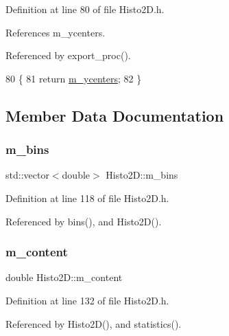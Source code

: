 Definition at line 80 of file Histo2\+D.\+h.



References m\+\_\+ycenters.



Referenced by export\+\_\+proc().


\begin{DoxyCode}
80                            \{  
81     \textcolor{keywordflow}{return} \hyperlink{classHisto2D_a2a431c0f22a038482fc8b3913743f08b}{m\_ycenters};
82   \}
\end{DoxyCode}


\subsection{Member Data Documentation}
\mbox{\label{classHisto2D_a84f6c03673499f34b981cdebf69d22aa}} 
\subsubsection{\texorpdfstring{m\+\_\+bins}{m\_bins}}
{\footnotesize\ttfamily std\+::vector$<$double$>$ Histo2\+D\+::m\+\_\+bins\hspace{0.3cm}{\ttfamily [private]}}



Definition at line 118 of file Histo2\+D.\+h.



Referenced by bins(), and Histo2\+D().

\mbox{\label{classHisto2D_ab70be93148e5c9b24e48b60c6b3b5f89}} 
\subsubsection{\texorpdfstring{m\+\_\+content}{m\_content}}
{\footnotesize\ttfamily double Histo2\+D\+::m\+\_\+content\hspace{0.3cm}{\ttfamily [private]}}



Definition at line 132 of file Histo2\+D.\+h.



Referenced by Histo2\+D(), and statistics().

\mbox{\label{classHisto2D_a3763bdf81d08ba44aa56c0e85de95ff3}} 
